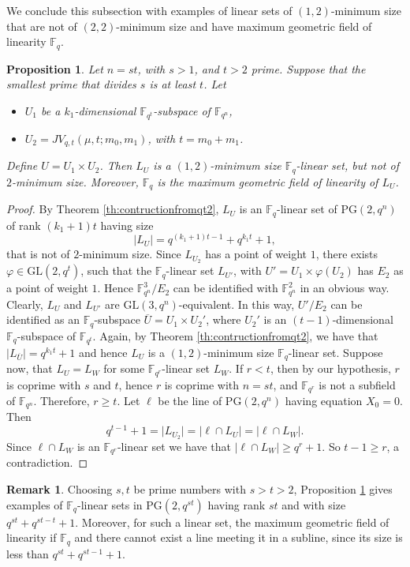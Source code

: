 \documentclass[11pt]{article}
\newtheorem{proposition}[theorem]{Proposition}
\theoremstyle{definition}
\newtheorem{remark}[theorem]{Remark}
\newcommand{\fqn}{\mathbb{F}_{q^n}}
\newcommand{\F}{{\mathbb F}}
\newcommand{\fq}{{\mathbb F}_{q}}
\newcommand{\PG}{\mathrm{PG}}
\begin{document}
We conclude this subsection with examples of linear sets of $(1,2)$-minimum size that are not of $(2,2)$-minimum size and have maximum geometric field of linearity $\F_q$.
\begin{proposition} \label{prop:belowdebeuleplane}
   Let $n=st$, with $s > 1$, and $t>2$ prime. Suppose that the smallest prime that divides $s$ is at least $t$. Let
   \begin{itemize}
 \item $U_1$ be a $k_1$-dimensional $\F_{q^t}$-subspace of $\F_{q^n}$,
 \item $U_2 = JV_{q,t}(\mu,t;m_0,m_1)$, with $t = m_0 + m_1$.
\end{itemize}
Define $U = U_1 \times U_2$.
Then $L_U$ is a $(1,2)$-minimum size $\fq$-linear set, but not of $2$-minimum size. Moreover, $\fq$ is the maximum geometric field of linearity of $L_U$.
\end{proposition}
\begin{proof}
By Theorem \ref{th:contructionfromqt2}, $L_U$ is an $\F_q$-linear set of $\PG(2,q^n)$ of rank $(k_1+1)t$ having size 
\[
\lvert L_U \rvert= q^{(k_1+1)t-1}+q^{k_1t}+1,
\]
that is not of $2$-minimum size. Since $L_{U_2}$ has a point of weight $1$, there exists $\varphi \in \mathrm{GL}(2,q^t)$, such that the $\F_q$-linear set $L_{U'}$, with $U'=U_1 \times \varphi(U_2)$ has $E_2$ as a point of weight $1$.
Hence $\F_{q^n}^{3}/E_2$ can be identified with $\F_{q^n}^{2}$ in an obvious way. Clearly, $L_U$ and $L_{U'}$ are $\mathrm{GL}(3,q^n)$-equivalent. In this way, $U'/E_2$ can be identified as an $\F_q$-subspace $\overline{U}=U_1 \times U_2'$, where $U_2'$ is an $(t-1)$-dimensional $\F_q$-subspace of $\F_{q^t}$. Again, by Theorem \ref{th:contructionfromqt2}, we have that $\lvert L_{\overline{U}} \rvert=q^{k_1t}+1$ and hence $L_U$ is a $(1,2)$-minimum size $\F_q$-linear set. 
Suppose now, that $L_U=L_{W}$ for some $\F_{q^r}$-linear set $L_W$. 
If $r < t$, then by our hypothesis, $r$ is coprime with $s$ and $t$, hence $r$ is coprime with $n = st$, and $\F_{q^r}$ is not a subfield of $\fqn$.
Therefore, $r \geq t$.
Let $\ell$ be the line of $\PG(2,q^n)$ having equation $X_0=0$. Then 
    \[
    q^{t-1}+1=\lvert L_{U_2} \rvert = \lvert \ell \cap L_{U}\rvert = \lvert \ell \cap L_{W}\rvert.
    \]
    Since $\ell \cap L_{W}$ is an $\F_{q^r}$-linear set we have that $\lvert \ell \cap L_{W} \rvert \geq q^r+1$. So $t-1 \geq r$, a contradiction.
\end{proof}

\begin{remark}
    Choosing $s,t$ be prime numbers with $s>t>2$, Proposition \ref{prop:belowdebeuleplane} gives examples of $\F_q$-linear sets in $\PG(2,q^{st})$ having rank $st$ and with size $q^{st}+q^{st-t}+1$. Moreover, for such a linear set, the maximum geometric field of linearity if $\F_q$ and there cannot exist a line meeting it in a subline, since its size is less than $q^{st}+q^{st-1}+1$.
\end{remark}
\end{document}
